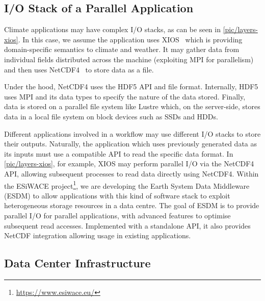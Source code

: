 \documentclass{superfri}
\begin{document}
\subsection{I/O Stack of a Parallel Application}



Climate applications may have complex I/O stacks, as can be seen in \cref{pic/layers-xios}.
In this case, we assume the application uses XIOS~\cite{xios} which is providing domain-specific semantics to climate and weather.
It may gather data from individual fields distributed across the machine (exploiting MPI for parallelism) and then uses NetCDF4~\cite{netcdf} to store data as a file.

Under the hood, NetCDF4 uses the HDF5 API and file format.
Internally, HDF5 uses MPI and its data types to specify the nature of the data stored.
Finally, data is stored on a parallel file system like Lustre which, on the server-side, stores data in a local file system on block devices such as SSDs and HDDs.

Different applications involved in a workflow may use different I/O stacks to store their outputs.
Naturally, the application which uses previously generated data as its inputs must use a compatible API to read the specific data format.
In \cref{pic/layers-xios}, for example, XIOS may perform parallel I/O via the NetCDF4 API, allowing subsequent processes to read data directly using NetCDF4.
Within the ESiWACE project\footnote{\url{https://www.esiwace.eu/}}, we are developing the Earth System Data Middleware (ESDM)\cite{esdm} to allow applications with this kind of software stack to exploit heterogeneous storage resources in a data centre.
The goal of ESDM is to provide parallel I/O for parallel applications, with advanced features to optimise subsequent read accesses.
Implemented with a standalone API, it also provides NetCDF integration allowing usage in existing applications.

\subsection{Data Center Infrastructure}
\end{document}
